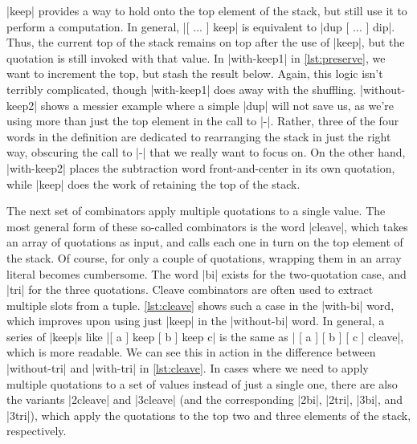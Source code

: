 \factor|keep| provides a way to hold onto the top element of the stack, but
still use it to perform a computation.  In general,
%
\factor|[ ... ] keep|
%
is equivalent to
%
\factor|dup [ ... ] dip|.
%
Thus, the current top of the stack remains on top after the use of
\factor|keep|, but the quotation is still invoked with that value.  In
\factor|with-keep1| in \vref{lst:preserve}, we want to increment the top, but
stash the result below.  Again, this logic isn't terribly complicated, though
\factor|with-keep1| does away with the shuffling.  \factor|without-keep2| shows
a messier example where a simple \factor|dup| will not save us, as we're using
more than just the top element in the call to \factor|-|.  Rather, three of the
four words in the definition are dedicated to rearranging the stack in just the
right way, obscuring the call to \factor|-| that we really want to focus on.
On the other hand, \factor|with-keep2| places the subtraction word
front-and-center in its own quotation, while \factor|keep| does the work of
retaining the top of the stack.


The next set of combinators apply multiple quotations to a single value.  The
most general form of these so-called  combinators is the word
\factor|cleave|, which takes an array of quotations as input, and calls each
one in turn on the top element of the stack.  Of course, for only a couple of
quotations, wrapping them in an array literal becomes cumbersome.  The word
\factor|bi| exists for the two-quotation case, and \factor|tri| for the three
quotations.  Cleave combinators are often used to extract multiple slots from a
tuple.  \vref{lst:cleave} shows such a case in the \factor|with-bi| word, which
improves upon using just \factor|keep| in the \factor|without-bi| word.  In
general, a series of \factor|keep|s like
%
\factor|[ a ] keep [ b ] keep c|
%
is the same as
%
\factor|{ [ a ] [ b ] [ c ] } cleave|,
%
which is more readable.  We can see this in action in the difference between
\factor|without-tri| and \factor|with-tri| in \vref{lst:cleave}.  In cases
where we need to apply multiple quotations to a set of values instead of just a
single one, there are also the variants \factor|2cleave| and \factor|3cleave|
(and the corresponding \factor|2bi|, \factor|2tri|, \factor|3bi|, and
\factor|3tri|), which apply the quotations to the top two and three elements of
the stack, respectively.
